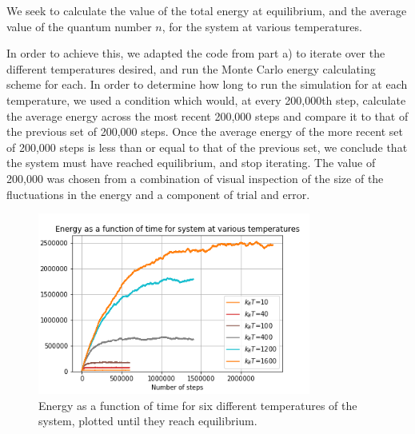 \documentclass{article}
\begin{document}
We seek to calculate the value of the total energy at equilibrium, and the average value of the quantum number $n$, for the system at various temperatures.

In order to achieve this, we adapted the code from part a) to iterate over the different temperatures desired, and run the Monte Carlo energy calculating scheme for each. In order to determine how long to run the simulation for at each temperature, we used a condition which would, at every 200,000th step, calculate the average energy across the most recent 200,000 steps and compare it to that of the previous set of 200,000 steps. Once the average energy of the more recent set of 200,000 steps is less than or equal to that of the previous set, we conclude that the system must have reached equilibrium, and stop iterating. The value of 200,000 was chosen from a combination of visual inspection of the size of the fluctuations in the energy and a component of trial and error.

\begin{figure}[H]
	\centering
	\includegraphics[width=0.8\textwidth]{../images/q1b_energies.png}
	\caption{Energy as a function of time for six different temperatures of the system, plotted until they reach equilibrium.}
	\label{fig:q1b_energies}
\end{figure}
\end{document}
